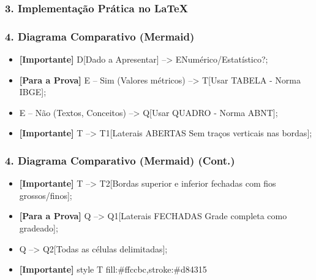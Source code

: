 \documentclass[10pt, aspectratio=169]{slidesiffmodelo}
\begin{document}
\begin{frame}[t]
    \frametitle{\color{iffgold}3. Implementação Prática no LaTeX}
\end{frame}

\begin{frame}[t]
    \frametitle{\color{iffgold}4. Diagrama Comparativo (Mermaid)}
    \begin{itemize}
        \item \textcolor{iffgreen}{\textbf{[Importante]} D[Dado a Apresentar] --> E{Numérico/Estatístico?};}
        \item \textcolor{iffviolet}{\textbf{[Para a Prova]} E -- Sim (Valores métricos) --> T[Usar TABELA - Norma IBGE];}
        \item E -- Não (Textos, Conceitos) --> Q[Usar QUADRO - Norma ABNT];
        \item \textcolor{iffgreen}{\textbf{[Importante]} T --> T1[Laterais ABERTAS \n Sem traços verticais nas bordas];}
    \end{itemize}
\end{frame}

\begin{frame}[t]
    \frametitle{\color{iffgold}4. Diagrama Comparativo (Mermaid) (Cont.)}
    \begin{itemize}
        \item \textcolor{iffgreen}{\textbf{[Importante]} T --> T2[Bordas superior e inferior fechadas \n com fios grossos/finos];}
        \item \textcolor{iffviolet}{\textbf{[Para a Prova]} Q --> Q1[Laterais FECHADAS \n Grade completa como gradeado];}
        \item Q --> Q2[Todas as células delimitadas];
        \item \textcolor{iffgreen}{\textbf{[Importante]} style T fill:\#ffccbc,stroke:\#d84315}
    \end{itemize}
\end{frame}
\end{document}
